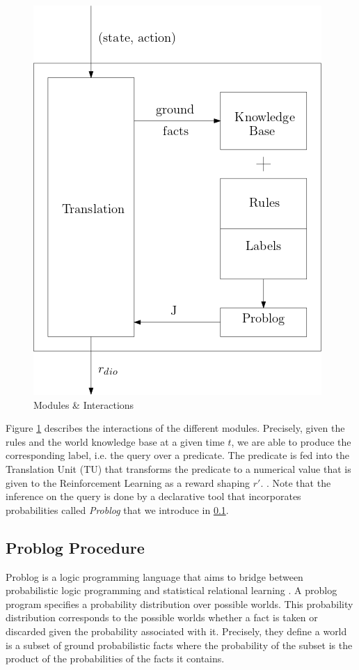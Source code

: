 \begin{figure}[H]
  \centering
  \includegraphics[scale=0.4]{figures/dynamics.png}
  \caption{Modules \& Interactions}
  \label{fig:mods}
\end{figure}

Figure \ref{fig:mods} describes the interactions of the different modules. Precisely, 
given the rules and the world knowledge base at a given time $t$, we are able 
to produce the corresponding label, i.e. the query over a predicate. The predicate is fed 
into the Translation Unit (TU) that transforms the predicate to a numerical value that is given to the Reinforcement Learning 
as a reward shaping $r'$. . Note that the inference on the query is done by a declarative tool that incorporates 
probabilities called \emph{Problog} that we introduce in \ref{sec:problog}.


\subsection{Problog Procedure} 
\label{sec:problog}
Problog is a logic programming language that aims to bridge between probabilistic 
logic programming and statistical relational learning \cite{fierens_van}. 
A problog program specifies a probability distribution over possible worlds. 
This probability distribution corresponds to the possible worlds whether a fact is taken 
or discarded given the probability associated with it. Precisely, they define a world 
is a subset of ground probabilistic facts where the probability of the subset is the product of 
the probabilities of the facts it contains.


